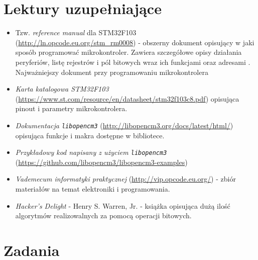 \documentclass{pdfBooklets}
\begin{document}
\section{Lektury uzupełniające}
\begin{itemize}

  \label{refman}
\item Tzw. \emph{reference manual} dla STM32F103 (\url{http://ln.opcode.eu.org/stm_rm0008}) - obszerny dokument opisujący w jaki sposób programować
  mikrokontroler. Zawiera szczegółowe opisy działania peryferiów, listę rejestrów i pól bitowych wraz ich funkcjami oraz
  adresami \footnotemark. Najważniejszy dokument przy programowaniu mikrokontrolera
  

\item \emph{Karta katalogowa STM32F103} (\url{https://www.st.com/resource/en/datasheet/stm32f103c8.pdf}) opisująca pinout i
  parametry mikrokontrolera.

\item \emph{Dokumentacja \Verb$libopencm3$} (\url{http://libopencm3.org/docs/latest/html/}) opisująca funkcje i makra dostępne
  w bibliotece.
  
\item \emph{Przykładowy kod napisany z użyciem \Verb$libopencm3$}\\ (\url{https://github.com/libopencm3/libopencm3-examples}) 
  
\item \emph{Vademecum informatyki praktycznej} (\url{http://vip.opcode.eu.org/}) - zbiór materiałów na temat elektroniki i programowania.
  
\item \emph{Hacker's Delight} - Henry S. Warren, Jr. - książka opisująca dużą ilość algorytmów realizowalnych za pomocą operacji bitowych.
\end{itemize}

\section{Zadania}
\end{document}
